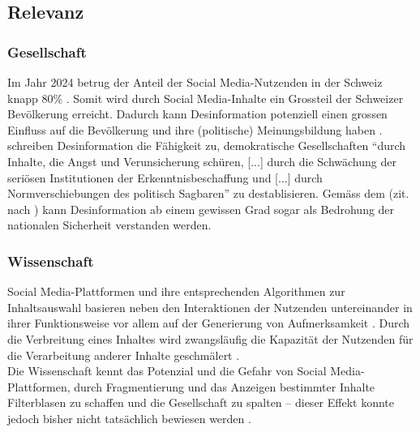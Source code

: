 \documentclass[12pt,a4paper]{article}        %
\begin{document}
\subsection{Relevanz}

\subsubsection{Gesellschaft}
Im Jahr 2024 betrug der Anteil der Social Media-Nutzenden in der Schweiz knapp 80\% \parencite[22]{we_are_social_anteil_2024}. Somit wird durch Social Media-Inhalte ein Grossteil der Schweizer Bevölkerung erreicht. Dadurch kann Desinformation potenziell einen grossen Einfluss auf die Bevölkerung und ihre (politische) Meinungsbildung haben \parencites[18]{grujic_warnhinweise_2024}[258]{hohlfeld_schlechte_2020}[1]{khan_fake_2021}. \\
\textcite[258]{hohlfeld_schlechte_2020} schreiben Desinformation die Fähigkeit zu, demokratische Gesellschaften “durch Inhalte, die Angst und Verunsicherung schüren, [...] durch die Schwächung der seriösen Institutionen der Erkenntnisbeschaffung und [...] durch Normverschiebungen des politisch Sagbaren” zu destablisieren. Gemäss dem \textcite{bundesministerium_des_innern_und_fur_heimat_desinformation_2022} (zit. nach \textcite[15]{teetz_Social Media-post_2023}) kann Desinformation ab einem gewissen Grad sogar als Bedrohung der nationalen Sicherheit verstanden werden.

\subsubsection{Wissenschaft}
Social Media-Plattformen und ihre entsprechenden Algorithmen zur Inhaltsauswahl basieren neben den Interaktionen der Nutzenden untereinander in ihrer Funktionsweise vor allem auf der Generierung von Aufmerksamkeit \parencites[vgl.][220]{schmidt_meinungsbildung_2022}[493]{behnke_manipulation_2018}. Durch die Verbreitung eines Inhaltes wird zwangsläufig die Kapazität der Nutzenden für die Verarbeitung anderer Inhalte geschmälert \parencite[248]{hohlfeld_schlechte_2020}. \\
Die Wissenschaft kennt das Potenzial und die Gefahr von Social Media-Plattformen, durch Fragmentierung und das Anzeigen bestimmter Inhalte Filterblasen zu schaffen und die Gesellschaft zu spalten – dieser Effekt konnte jedoch bisher nicht tatsächlich bewiesen werden \parencite[220]{schmidt_meinungsbildung_2022}.\\
\end{document}
